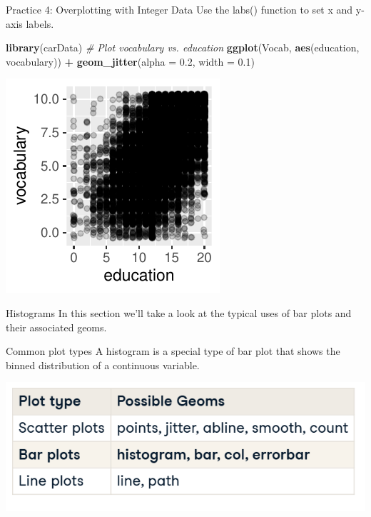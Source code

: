 \documentclass[
  ignorenonframetext,
]{beamer}
\newenvironment{Shaded}{\begin{snugshade}}{\end{snugshade}}
\newcommand{\AttributeTok}[1]{\textcolor[rgb]{0.13,0.29,0.53}{#1}}
\newcommand{\CommentTok}[1]{\textcolor[rgb]{0.56,0.35,0.01}{\textit{#1}}}
\newcommand{\FloatTok}[1]{\textcolor[rgb]{0.00,0.00,0.81}{#1}}
\newcommand{\FunctionTok}[1]{\textcolor[rgb]{0.13,0.29,0.53}{\textbf{#1}}}
\newcommand{\NormalTok}[1]{#1}
\newcommand{\SpecialCharTok}[1]{\textcolor[rgb]{0.81,0.36,0.00}{\textbf{#1}}}
\begin{document}
\begin{frame}[fragile]{Practice 4: Overplotting with Integer Data}
\label{practice-4-overplotting-with-integer-data-1}
Use the labs() function to set x and y-axis labels.


\begin{Shaded}
\begin{Highlighting}[]
\FunctionTok{library}\NormalTok{(carData)}
\CommentTok{\# Plot vocabulary vs. education}
\FunctionTok{ggplot}\NormalTok{(Vocab, }\FunctionTok{aes}\NormalTok{(education, vocabulary)) }\SpecialCharTok{+} \FunctionTok{geom\_jitter}\NormalTok{(}\AttributeTok{alpha =} \FloatTok{0.2}\NormalTok{,}
    \AttributeTok{width =} \FloatTok{0.1}\NormalTok{)}
\end{Highlighting}
\end{Shaded}

\begin{center}\includegraphics[width=0.5\linewidth]{Figs/unnamed-chunk-36-1} \end{center}
\end{frame}

\begin{frame}{Histograms}
\label{histograms}
In this section we'll take a look at the typical uses of bar plots and
their associated geoms.
\end{frame}

\begin{frame}{Common plot types}
\label{common-plot-types-1}
A histogram is a special type of bar plot that shows the binned
distribution of a continuous variable.

\includegraphics{../images/im198.png}
\end{frame}
\end{document}
